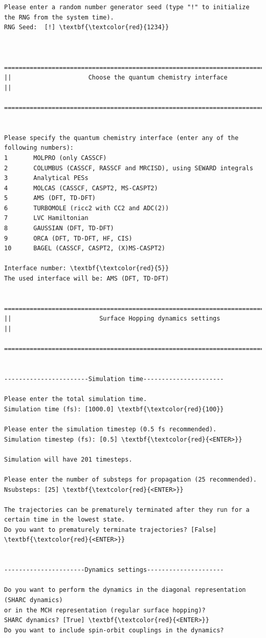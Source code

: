 \documentclass[a4paper,11pt,DIV=15,openany]{scrbook}
\begin{document}
\begin{oframed}
\begin{Verbatim}[commandchars=\\\{\}]
Please enter a random number generator seed (type "!" to initialize the RNG from the system time).
RNG Seed:  [!] \textbf{\textcolor{red}{1234}}


  ================================================================================
||                     Choose the quantum chemistry interface                     ||
  ================================================================================


Please specify the quantum chemistry interface (enter any of the following numbers):
1       MOLPRO (only CASSCF)
2       COLUMBUS (CASSCF, RASSCF and MRCISD), using SEWARD integrals
3       Analytical PESs
4       MOLCAS (CASSCF, CASPT2, MS-CASPT2)
5       AMS (DFT, TD-DFT)
6       TURBOMOLE (ricc2 with CC2 and ADC(2))
7       LVC Hamiltonian
8       GAUSSIAN (DFT, TD-DFT)
9       ORCA (DFT, TD-DFT, HF, CIS)
10      BAGEL (CASSCF, CASPT2, (X)MS-CASPT2)

Interface number: \textbf{\textcolor{red}{5}}
The used interface will be: AMS (DFT, TD-DFT)

  ================================================================================
||                        Surface Hopping dynamics settings                       ||
  ================================================================================


-----------------------Simulation time----------------------

Please enter the total simulation time.
Simulation time (fs): [1000.0] \textbf{\textcolor{red}{100}}

Please enter the simulation timestep (0.5 fs recommended).
Simulation timestep (fs): [0.5] \textbf{\textcolor{red}{<ENTER>}}

Simulation will have 201 timesteps.

Please enter the number of substeps for propagation (25 recommended).
Nsubsteps: [25] \textbf{\textcolor{red}{<ENTER>}}

The trajectories can be prematurely terminated after they run for a certain time in the lowest state. 
Do you want to prematurely terminate trajectories? [False] \textbf{\textcolor{red}{<ENTER>}}


----------------------Dynamics settings---------------------

Do you want to perform the dynamics in the diagonal representation (SHARC dynamics) 
or in the MCH representation (regular surface hopping)?
SHARC dynamics? [True] \textbf{\textcolor{red}{<ENTER>}}
Do you want to include spin-orbit couplings in the dynamics?


\end{Verbatim}
\end{oframed}
\end{document}
